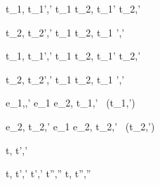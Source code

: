   {t_1,\sigma {} {t_1}',{\sigma}'}
  {t_1 \And t_2,\sigma {} {t_1}' \And t_2,{\sigma}'}
  {}

  {t_2,\sigma {} {t_2}',{\sigma}'}
  {t_1 \And t_2,\sigma {} t_1 ',{\sigma}'}
  {}


  {t_1,\sigma {} {t_1}',{\sigma}'}
  {t_1 \Or t_2,\sigma {} {t_1}' \Or t_2,{\sigma}'}
  {}

  {t_2,\sigma {} {t_2}',{\sigma}' }
  {t_1 \Or t_2,\sigma {} t_1 ',{\sigma}'}
  {}


  {e_1,\sigma {},{\sigma}'}
  {e_1 \Xor e_2,\sigma \xrightarrow[]{\Left} {t_1},{\sigma}'}
  {\neg\Failing\ ({t_1},{\sigma}')}

  {e_2,\sigma {\normalise} {t_2},{\sigma}'}
  {e_1 \Xor e_2,\sigma \xrightarrow[]{\Right} {t_2},{\sigma}'}
  { \neg\Failing\ ({t_2},{\sigma}')}




  {t,\sigma {} t',\sigma'}



  {t,\sigma {} {t}',{\sigma}' \Quad
   {t}',{\sigma}' {\normalise} {t}'',{\sigma}''}
  {t,\sigma {} {t}'',{\sigma}''}
  {}
